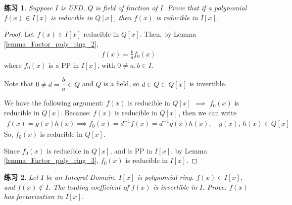 \documentclass[utf8]{ctexbook}
\newtheorem{exercise}{练习}[section]
\begin{document}
\begin{exercise}
Suppose $I$ is UFD. $Q$ is field of fraction of $I$. Prove that if a polynomial $f(x) \in I[x]$ is reducible in $Q[x]$, then $f(x)$ is reducible in $I[x]$.
\end{exercise}

\begin{proof}
Let $f(x) \in I[x] $ reducible in $Q[x]$. Then, by Lemma \ref{lemma_Factor_poly_ring_2}, 
\begin{align*}
f(x) = \frac{b}{a} f_0 (x)
\end{align*}
where $f_0 (x)$ is a PP in $I[x]$, with $0 \neq a, b \in I$.

Note that $0 \neq d = \dfrac{b}{a} \in Q$ and $Q$ is a field, so $d \in Q \subset Q[x]$ is invertible.

We have the following argument: $f(x)$ is reducible in $Q[x]$ $\implies$ $f_0 (x)$ is reducible in $Q[x]$. Because: $f(x)$ is reducible in $Q[x]$, then we can write 
\begin{align*}
f(x) = g(x) h(x) \implies f_0 (x) = d^{-1} f(x) = d^{-1} g(x) h(x), \quad g(x),\, h(x) \in Q[x]
\end{align*}
So, $f_0 (x)$ is reducible in $Q[x]$.

Since $f_0 (x)$ is reducible in $Q[x]$, and is PP in $I[x]$, by Lemma \ref{lemma_Factor_poly_ring_3}, $f_0 (x)$ is reducible in $I[x]$.
\end{proof}


\begin{exercise}
Let $I$ be an Integral Domain. $I[x]$ is polynomial ring. $f(x) \in I[x]$, and $f(x) \not \in I$. The leading coefficient of $f(x)$ is invertible in $I$. Prove: $f(x)$ has factorization in $I[x]$.
\end{exercise}
\end{document}
